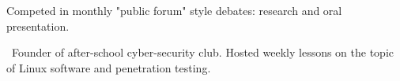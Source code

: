 
\begin{cventries}

  {Competed in monthly "public forum" style debates: research and oral presentation.}
  
  {Founder of after-school cyber-security club. Hosted weekly lessons on the topic of Linux software and penetration testing. 
 }


\end{cventries}

